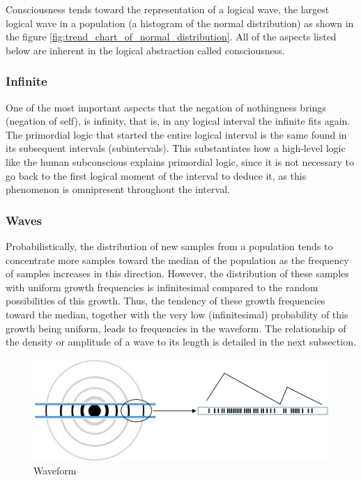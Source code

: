 Consciousness tends toward the representation of a logical wave, the largest logical wave in a population (a histogram of the normal distribution) as shown in the figure \ref{fig:trend_chart_of_normal_distribution}. All of the aspects listed below are inherent in the logical abstraction called consciousness.

\subsubsection{Infinite}
One of the most important aspects that the negation of nothingness brings (negation of self), is infinity, that is, in any logical interval the infinite fits again. The primordial logic that started the entire logical interval is the same found in its subsequent intervals (subintervals). This substantiates how a high-level logic like the human subconscious explains primordial logic, since it is not necessary to go back to the first logical moment of the interval to deduce it, as this phenomenon is omnipresent throughout the interval.

\subsubsection{Waves}
Probabilistically, the distribution of new samples from a population tends to concentrate more samples toward the median of the population as the frequency of samples increases in this direction. However, the distribution of these samples with uniform growth frequencies is infinitesimal compared to the random possibilities of this growth. Thus, the tendency of these growth frequencies toward the median, together with the very low (infinitesimal) probability of this growth being uniform, leads to frequencies in the waveform. The relationship of the density or amplitude of a wave to its length is detailed in the next subsection.
	\begin{figure}[H]
	\caption{Waveform}
	\label{fig:consciousness_waves}
	\centering
	\includegraphics[scale=.8]{sections/images/consciousness_waves.jpg}
	\end{figure}

